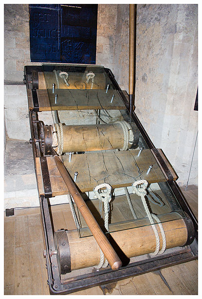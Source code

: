 \begin{frame}
\begin{minipage}{0.2\textwidth}
    \end{minipage}
    \begin{minipage}{0.5\textwidth}
        \centering
        \includegraphics[height=0.9\textheight]{img/rack.png}

\end{minipage}
\end{frame}
